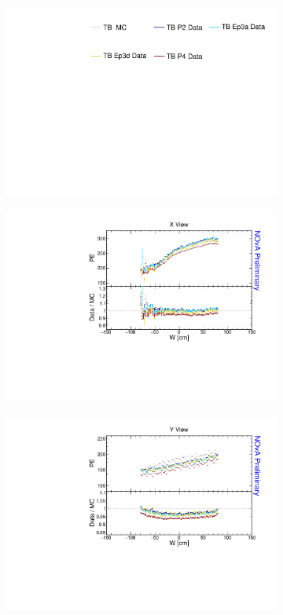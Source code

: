 \begin{figure}[!ht]
  \begin{subfigure}{\textwidth}
  \centering
    \includegraphics[height=0.2\linewidth]{essentialsec_tb/legend.pdf}
  \end{subfigure}
  \vspace*{2mm}

  \begin{subfigure}{0.495\textwidth}
    \includegraphics[width=\linewidth]{essentialsec_tb/pe_w_x.pdf}
  \end{subfigure}
  \begin{subfigure}{0.495\textwidth}
    \includegraphics[width=\linewidth]{essentialsec_tb/pe_w_y.pdf}

\end{subfigure}
\end{figure}
